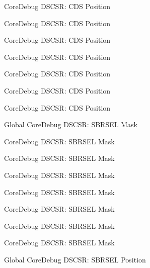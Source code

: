 \begin{DoxyRefList}
\label{deprecated__deprecated000365}%
%
Core\+Debug DSCSR\+: CDS Position 

\label{deprecated__deprecated000544}%
%
Core\+Debug DSCSR\+: CDS Position 

\label{deprecated__deprecated000147}%
%
Core\+Debug DSCSR\+: CDS Position 

\label{deprecated__deprecated000646}%
%
Core\+Debug DSCSR\+: CDS Position 

\label{deprecated__deprecated000441}%
%
Core\+Debug DSCSR\+: CDS Position 

\label{deprecated__deprecated000223}%
%
Core\+Debug DSCSR\+: CDS Position 

\label{deprecated__deprecated000286}%
%
Core\+Debug DSCSR\+: CDS Position  
\item[Global \doxylink{group___c_m_s_i_s___s_c_b_gaaffe28a24f05446e55ba3d75bb6f4cd0}{Core\+Debug\+\_\+\+DSCSR\+\_\+\+SBRSEL\+\_\+\+Msk} ]\label{deprecated__deprecated000444}%
%
Core\+Debug DSCSR\+: SBRSEL Mask 

\label{deprecated__deprecated000226}%
%
Core\+Debug DSCSR\+: SBRSEL Mask 

\label{deprecated__deprecated000368}%
%
Core\+Debug DSCSR\+: SBRSEL Mask 

\label{deprecated__deprecated000150}%
%
Core\+Debug DSCSR\+: SBRSEL Mask 

\label{deprecated__deprecated000289}%
%
Core\+Debug DSCSR\+: SBRSEL Mask 

\label{deprecated__deprecated000547}%
%
Core\+Debug DSCSR\+: SBRSEL Mask 

\label{deprecated__deprecated000649}%
%
Core\+Debug DSCSR\+: SBRSEL Mask 

\label{deprecated__deprecated000096}%
%
Core\+Debug DSCSR\+: SBRSEL Mask  
\item[Global \doxylink{group___c_m_s_i_s___s_c_b_ga7450603163415ab4d4e4a7a767879eae}{Core\+Debug\+\_\+\+DSCSR\+\_\+\+SBRSEL\+\_\+\+Pos} ]\label{deprecated__deprecated000149}%
%
Core\+Debug DSCSR\+: SBRSEL Position 


\end{DoxyRefList}

